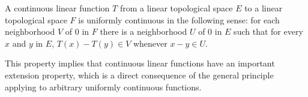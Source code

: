 A continuous linear function $T$ from a linear topological space $E$ to a linear topological space $F$ is uniformly continuous in the following sense: for each neighborhood $V$ of $0$ in $F$ there is a neighborhood $U$ of $0$ in $E$ such that for every $x$ and $y$ in $E$, $T(x) - T(y) \in V$ whenever $x - y \in U$.

This property implies that continuous linear functions have an important extension property, which is a direct consequence of the general principle applying to arbitrary uniformly continuous functions.

